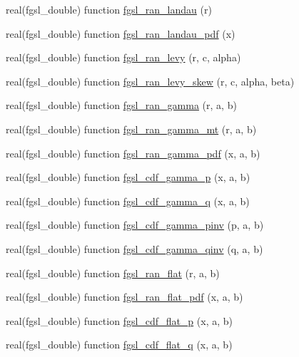 \begin{DoxyCompactItemize}
\item 
real(fgsl\+\_\+double) function \hyperlink{rng_8finc_a4fddb2cbe7750f04fb6fafeaca3d4475}{fgsl\+\_\+ran\+\_\+landau} (r)
\item 
real(fgsl\+\_\+double) function \hyperlink{rng_8finc_a3838bd54f8cd69e289ce48f50d804e13}{fgsl\+\_\+ran\+\_\+landau\+\_\+pdf} (x)
\item 
real(fgsl\+\_\+double) function \hyperlink{rng_8finc_a8453b1f8c3e81ec2eaabfc6612ce44aa}{fgsl\+\_\+ran\+\_\+levy} (r, c, alpha)
\item 
real(fgsl\+\_\+double) function \hyperlink{rng_8finc_a43ea311600d0fdcccc054b043d6ec519}{fgsl\+\_\+ran\+\_\+levy\+\_\+skew} (r, c, alpha, beta)
\item 
real(fgsl\+\_\+double) function \hyperlink{rng_8finc_a75b8328e601702d544764bf044864486}{fgsl\+\_\+ran\+\_\+gamma} (r, a, b)
\item 
real(fgsl\+\_\+double) function \hyperlink{rng_8finc_ac1a501f4dfe734274569151dfaf25477}{fgsl\+\_\+ran\+\_\+gamma\+\_\+mt} (r, a, b)
\item 
real(fgsl\+\_\+double) function \hyperlink{rng_8finc_ab4786a7f6aa42d75d825b5a32d193ce4}{fgsl\+\_\+ran\+\_\+gamma\+\_\+pdf} (x, a, b)
\item 
real(fgsl\+\_\+double) function \hyperlink{rng_8finc_a0bac4d4b3ce06b0f58112852fa7b32ce}{fgsl\+\_\+cdf\+\_\+gamma\+\_\+p} (x, a, b)
\item 
real(fgsl\+\_\+double) function \hyperlink{rng_8finc_af7323ad0e46d157a40a3a1e8c5adbcc3}{fgsl\+\_\+cdf\+\_\+gamma\+\_\+q} (x, a, b)
\item 
real(fgsl\+\_\+double) function \hyperlink{rng_8finc_ad98d9f27ebc4c29347f7178437ad2042}{fgsl\+\_\+cdf\+\_\+gamma\+\_\+pinv} (p, a, b)
\item 
real(fgsl\+\_\+double) function \hyperlink{rng_8finc_a98d9bdf34354f709686562da8a8852e7}{fgsl\+\_\+cdf\+\_\+gamma\+\_\+qinv} (q, a, b)
\item 
real(fgsl\+\_\+double) function \hyperlink{rng_8finc_acd9641232d480f05b1abe1590c0f27b2}{fgsl\+\_\+ran\+\_\+flat} (r, a, b)
\item 
real(fgsl\+\_\+double) function \hyperlink{rng_8finc_a4436b84330131f34805ea941042e464a}{fgsl\+\_\+ran\+\_\+flat\+\_\+pdf} (x, a, b)
\item 
real(fgsl\+\_\+double) function \hyperlink{rng_8finc_a53c32d3a1c1e49be4369425594820754}{fgsl\+\_\+cdf\+\_\+flat\+\_\+p} (x, a, b)
\item 
real(fgsl\+\_\+double) function \hyperlink{rng_8finc_a98244f046ad60405fb90bd7629d5f1be}{fgsl\+\_\+cdf\+\_\+flat\+\_\+q} (x, a, b)

\end{DoxyCompactItemize}
